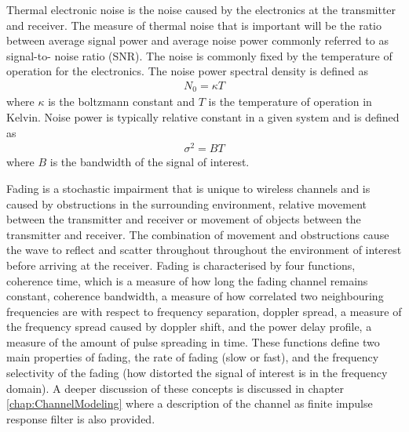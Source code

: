 Thermal electronic noise is the noise %
caused by the electronics at the %
transmitter and receiver. The measure %
of thermal noise that is important %
will be the ratio between average %
signal power and average noise power %
commonly referred to as signal-to-%
noise ratio (SNR). The noise is %
commonly fixed by the temperature %
of operation for the electronics. %
The noise power spectral density %
is defined as %
\begin{align}
	N_{0} = \kappa T
\end{align}
where $\kappa$ is the boltzmann %
constant and $T$ is the temperature %
of operation in Kelvin. Noise %
power is typically relative constant %
in a given system and is defined as
\begin{align}
	\sigma^{2} = BT
\end{align}
where $B$ is the bandwidth of the %
signal of interest.

Fading is a stochastic impairment %
that is unique to wireless %
channels and is caused by obstructions %
in the surrounding environment, %
relative movement between the %
transmitter and receiver %
or movement of objects between %
the transmitter and receiver. The %
combination of movement and %
obstructions cause the wave to %
reflect and scatter throughout %
throughout the environment of %
interest before arriving %
at the receiver. Fading is %
characterised by four functions, %
coherence time, which is a measure %
of how long the fading channel %
remains constant, coherence bandwidth, %
a measure of how correlated two neighbouring %
frequencies are with respect to frequency %
separation, doppler spread, a measure of %
the frequency spread caused by doppler shift, %
and the power delay profile, a measure of %
the amount of pulse spreading in time. %
These functions define two main properties %
of fading, the rate of fading (slow or fast), %
and the frequency selectivity of the fading %
(how distorted the signal of interest is %
in the frequency domain). A deeper discussion %
of these concepts is discussed in chapter %
\ref{chap:ChannelModeling} where a description %
of the channel as finite impulse response filter %
is also provided.

